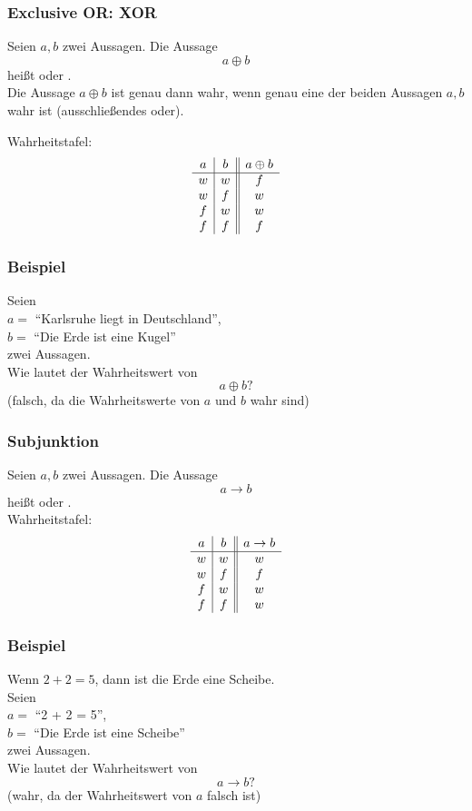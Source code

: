 %
%
\begin{frame}\frametitle{Exclusive OR: XOR}

	Seien $a, b$ zwei Aussagen. Die Aussage
	$$
		a \oplus b
	$$
	heißt  oder . \\[1mm]
	
	Die Aussage $a \oplus b$ ist genau dann wahr, wenn genau eine der beiden Aussagen $a, b$ wahr ist 
	(ausschließendes oder).

	\vfill
	Wahrheitstafel:
	$$
		\begin{array}{c | c || c}
			a	& b	& a\oplus b	\\ \hline
			w	& w	& f		\\
			w	& f	& w		\\
			f	& w	& w		\\
			f	& f	& f	
		\end{array}
	$$
	
\end{frame}
%
%
\begin{frame}\frametitle{Beispiel}
	
	Seien \\
	$a = $ ``Karlsruhe liegt in Deutschland'',\\
	$b = $ ``Die Erde ist eine Kugel''\\
	 zwei Aussagen.\\[2mm]
	 
	 Wie lautet der Wahrheitswert von 
	 $$
	 	a\oplus b?
	 $$
	 \pause
	 (falsch, da die Wahrheitswerte von $a$ und $b$ wahr sind)
	
\end{frame}
%
%
\begin{frame}\frametitle{Subjunktion}

	Seien $a, b$ zwei Aussagen. Die Aussage
	$$
		a \rightarrow b
	$$
	heißt  oder . \\

	\vfill
	Wahrheitstafel:
	$$
		\begin{array}{c | c || c}
			a	& b	& a\rightarrow b	\\ \hline
			w	& w	& w		\\
			w	& f	& f		\\
			f	& w	& w		\\
			f	& f	& w	
		\end{array}
	$$
	
\end{frame}
%
%
\begin{frame}\frametitle{Beispiel}
	
	Wenn $2+2=5$, dann ist die Erde eine Scheibe.\\[2mm]
	
	\pause
	Seien \\
	$a = $ ``2 + 2 = 5'',\\
	$b = $ ``Die Erde ist eine Scheibe''\\
	 zwei Aussagen.\\[2mm]
	 
	 Wie lautet der Wahrheitswert von 
	 $$
	 	a\rightarrow  b?
	 $$
	 \pause
	 (wahr, da der Wahrheitswert von $a$ falsch ist)
	 
\end{frame}
